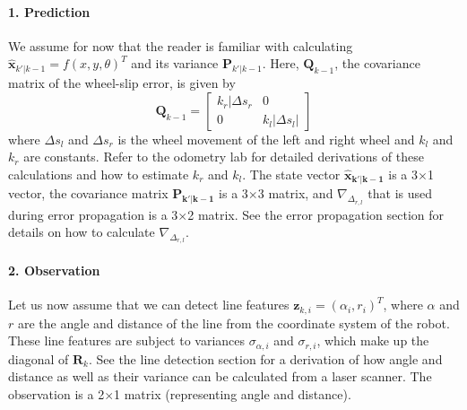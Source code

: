 \paragraph{1. Prediction}
We assume for now that the reader is familiar with calculating $ \hat{\boldsymbol{x}}_{k'|k-1}=f(x,y,\theta)^T$ and its variance $ \boldsymbol{P}_{k'|k-1}$. Here, $ \boldsymbol{Q}_{k-1}$, the covariance matrix of the wheel-slip error,  is given by
\begin{equation}
\boldsymbol{Q}_{k-1}=\left[\begin{array}{cc}k_r|\Delta s_r & 0\\0 & k_l|\Delta s_l|\end{array}\right]
\end{equation}
where $\Delta s_l$ and $\Delta s_r$ is the wheel movement of the left and right wheel and $k_l$ and $k_r$ are constants. Refer to the odometry lab for detailed derivations of these calculations and how to estimate $ k_r$ and $ k_l$.  The state vector $ \boldsymbol{\hat{x}_{k'|k-1}}$ is a 3$\times$1 vector, the covariance matrix $ \boldsymbol{P_{k'|k-1}}$ is a 3$\times$3 matrix, and $ \nabla_{\Delta_{r,l}}$ that is used during error propagation is a 3$\times$2 matrix. See the error propagation section for details on how to calculate $ \nabla_{\Delta_{r,l}}$.


\paragraph{2. Observation}
Let us now assume that we can detect line features $ \boldsymbol{z}_{k,i}=(\alpha_i,r_i)^T$, where $ \alpha$ and $ r$ are the angle and distance of the line from the coordinate system of the robot. These line features are subject to variances $ \sigma_{\alpha,i}$ and $ \sigma_{r,i}$, which make up the diagonal of $ \boldsymbol{R}_{k}$. See the line detection section for a derivation of how angle and distance as well as their variance can be calculated from a laser scanner. The observation is a 2$\times$1 matrix (representing angle and distance).

